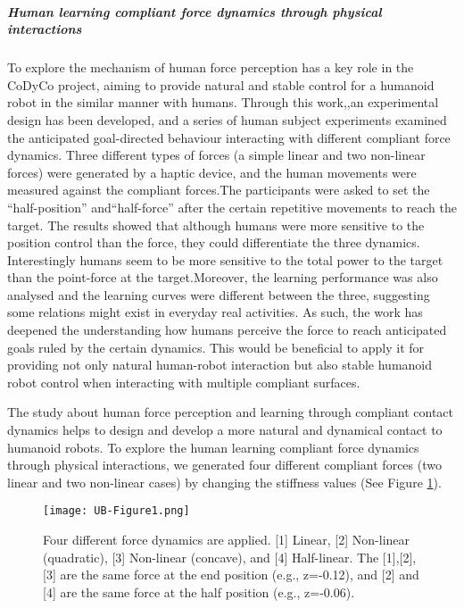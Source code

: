 \subparagraph*{Human learning compliant force dynamics through physical interactions}
To explore the mechanism of human force perception has a key role in the CoDyCo project, aiming to provide natural and stable control for a humanoid robot in the similar manner with humans. Through this work,,an experimental design has been developed, and a series of human subject experiments examined the anticipated goal-directed behaviour interacting with different compliant force dynamics. Three different types of forces (a simple linear and two non-linear forces) were generated by a haptic device, and the human movements were measured against the compliant forces.The participants were asked to set the “half-position”  and“half-force”  after the certain repetitive movements to reach the target. The results showed that although humans were more sensitive to the position control than the force, they could differentiate the three dynamics. Interestingly humans seem to be more sensitive to the total power to the target than the point-force at the target.Moreover, the learning performance was also analysed and the learning curves were different between the three, suggesting some relations might exist in everyday real activities. As such, the work has deepened the understanding how humans perceive the force to reach anticipated goals ruled by the certain dynamics. This would be beneficial to apply it for providing not only natural human-robot interaction but also stable humanoid robot control when interacting with multiple compliant surfaces.

The study about human force perception and learning through compliant contact dynamics helps to design and develop a more natural and dynamical contact to humanoid robots. To explore the human learning compliant force dynamics through physical interactions, we generated four different compliant forces (two linear and two non-linear cases) by changing the stiffness values (See Figure \ref{fig:forcedyn}).

\begin{figure}[h!]
	\centering
	\texttt{[image: UB-Figure1.png]}
	\caption{Four different force dynamics are applied. [1] Linear, [2] Non-linear (quadratic), [3] Non-linear (concave), and [4] Half-linear. The [1],[2],[3] are the same force at the end position (e.g., z=-0.12), and [2] and [4] are the same force at the half position  (e.g., z=-0.06).}
	\label{fig:forcedyn}
\end{figure}

\newpage


